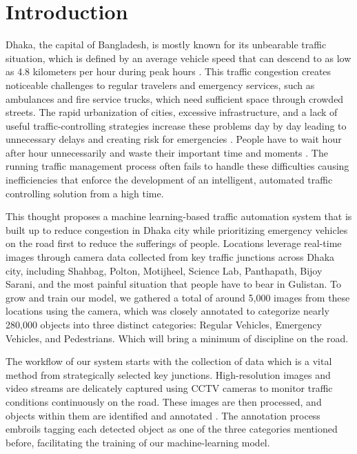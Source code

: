 \documentclass[usenatbib]{tjaa}
\begin{document}
\section[]{Introduction}
Dhaka, the capital of Bangladesh, is mostly known for its unbearable traffic situation, which is defined by an average vehicle speed that can descend to as low as 4.8 kilometers per hour during peak hours \citep{clar:a1}. This traffic congestion creates noticeable challenges to regular travelers and emergency services, such as ambulances and fire service trucks, which need sufficient space through crowded streets. The rapid urbanization of cities, excessive infrastructure, and a lack of useful traffic-controlling strategies increase these problems day by day leading to unnecessary delays and creating risk for emergencies \citep{clar:a16}. People have to wait hour after hour unnecessarily and waste their important time and moments \citep{clar:a2}. The running traffic management process often fails to handle these difficulties causing inefficiencies that enforce the development of an intelligent, automated traffic controlling solution from a high time. 


This thought proposes a machine learning-based traffic automation system that is built up to reduce congestion in Dhaka city while prioritizing emergency vehicles on the road first to reduce the sufferings of people. Locations leverage real-time images through camera data collected from key traffic junctions across Dhaka city, including Shahbag, Polton, Motijheel, Science Lab, Panthapath, Bijoy Sarani, and the most painful situation that people have to bear in Gulistan. To grow and train our model, we gathered a total of around 5,000 images from these locations using the camera, which was closely annotated to categorize nearly 280,000 objects into three distinct categories: Regular Vehicles, Emergency Vehicles, and Pedestrians. Which will bring a minimum of discipline on the road. 


The workflow of our system starts with the collection of data which is a vital method from strategically selected key junctions. High-resolution images and video streams are delicately captured using CCTV cameras to monitor traffic conditions continuously on the road. These images are then processed, and objects within them are identified and annotated \citep{clar:a3}. The annotation process embroils tagging each detected object as one of the three categories mentioned before, facilitating the training of our machine-learning model. 
\end{document}
